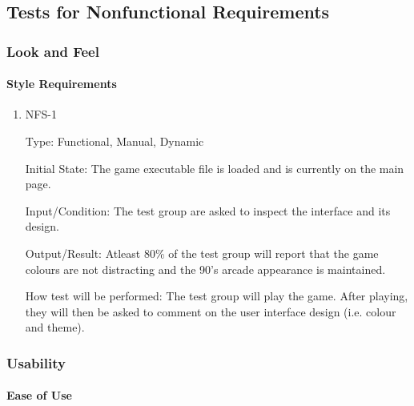 \documentclass[12pt, titlepage]{article}
\begin{document}
\subsection{Tests for Nonfunctional Requirements}

\subsubsection{Look and Feel}

\paragraph{Style Requirements}

\begin{enumerate}


\item{NFS-1\\}

Type: Functional, Manual, Dynamic 
					
Initial State: The game executable file is loaded and is currently on the main page.
					
Input/Condition: The test group are asked to inspect the interface and its design.
					
Output/Result: Atleast 80\% of the test group will report that the game colours are not distracting and the 90's arcade appearance is maintained.
					
How test will be performed: The test group will play the game. After playing, they will then be asked to comment on the user interface design (i.e. colour and theme).

\end{enumerate}


\subsubsection{Usability}
		
\paragraph{Ease of Use}
\end{document}
